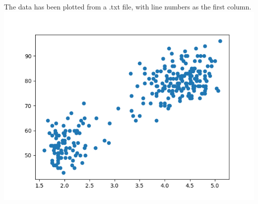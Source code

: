The data has been plotted from a .txt file, with line numbers as the first column.\\ \includegraphics[width=0.5\linewidth]{old_faithful.png}
